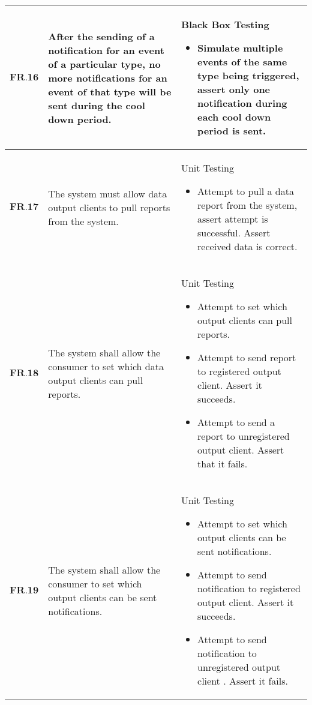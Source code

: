\begin{longtable}[H]{| p{1.5cm}| p{6cm}| p{9cm}|}
        $\textbf{FR.16}$ & After the sending of a notification for an event of a particular type, no more notifications for an event of that type will be sent during the cool down period. & Black Box Testing\begin{itemize}\item Simulate multiple events of the same type being triggered, assert only one notification during each cool down period is sent.\end{itemize}                                                                                                                    \\ \hline
        $\textbf{FR.17}$ & The system must allow data output clients to pull reports from the system.                                                                                       & Unit Testing\begin{itemize}\item Attempt to pull a data report from the system, assert attempt is successful. Assert received data is correct.\end{itemize}                                                                                                                                                                                          \\ \hline
       $ \textbf{FR.18}$ & The system shall allow the consumer to set which data output clients can pull reports.                                                                           & Unit Testing\begin{itemize}\item Attempt to set which output clients can pull reports.\item Attempt to send report to registered output client. Assert it succeeds.\item Attempt to send a report to unregistered output client. Assert that it fails.\end{itemize}                 \\ \hline
    	$\textbf{FR.19}$ & The system shall allow the consumer to set which output clients can be sent notifications.                                                                       & Unit Testing\begin{itemize}\item Attempt to set which output clients can be sent notifications.\item Attempt to send notification to registered output client. Assert it succeeds.\item Attempt to send notification to unregistered output client . Assert it fails.\end{itemize} \\ \hline
\end{longtable}
